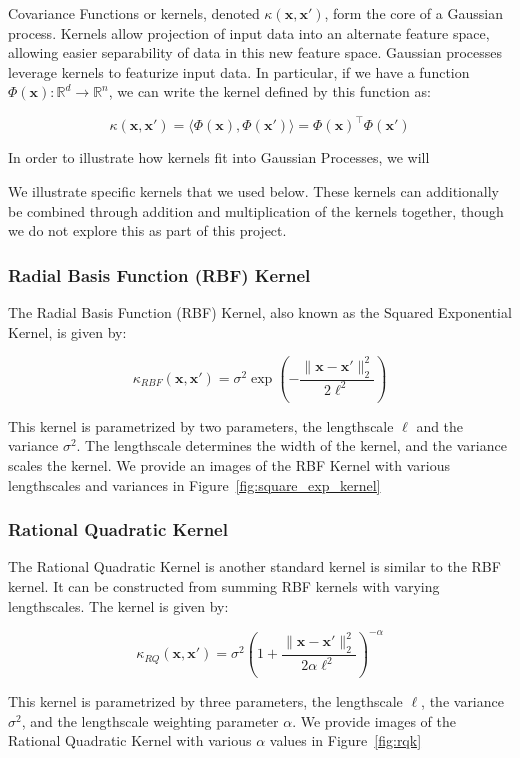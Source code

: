 \documentclass{article}
\newcommand{\R}{\mathbb{R}}
\newcommand{\bx}{\boldsymbol{x}}
\begin{document}
Covariance Functions or kernels, denoted $\kappa(\bx, \bx')$, form the core of a Gaussian process. Kernels allow
projection of input data into an alternate feature space, allowing easier separability of data in this new feature
space. Gaussian processes leverage kernels to featurize input data. In particular, if we have a function
$\Phi(\bx): \R^d \rightarrow \R^n$, we can write the kernel defined by this function as:

\[
  \kappa(\bx, \bx') = \langle \Phi(\bx), \Phi(\bx') \rangle = \Phi(\bx)^\top \Phi(\bx')
\]

In order to illustrate how kernels fit into Gaussian Processes, we will 


We illustrate specific kernels that we used below. These kernels can additionally be combined through addition and
multiplication of the kernels together, though we do not explore this as part of this project.

\subsubsection{Radial Basis Function (RBF) Kernel}

The Radial Basis Function (RBF) Kernel, also known as the Squared Exponential Kernel, is given by:

\[
  \kappa_{RBF}(\bx, \bx') = \sigma^2 \exp\left( - \frac{\|\bx -\bx' \|_{2}^{2}}{2 \ell^2} \right)
\]

This kernel is parametrized by two parameters, the lengthscale $\ell$ and the variance $\sigma^2$. The lengthscale
determines the width of the kernel, and the variance scales the kernel\cite{duvenaud_automatic_2014}. We provide an
images of the RBF Kernel with various lengthscales and variances in Figure~\ref{fig:square_exp_kernel}

\subsubsection{Rational Quadratic Kernel}

The Rational Quadratic Kernel is another standard kernel is similar to the RBF kernel. It can be constructed from
summing RBF kernels with varying lengthscales. The kernel is given by:

\[
  \kappa_{RQ}(\bx, \bx') = \sigma^2 \left( 1 + \frac{\| \bx - \bx' \|_{2}^{2}}{2 \alpha \ell^2} \right)^{-\alpha}
\]

This kernel is parametrized by three parameters, the lengthscale $\ell$, the variance $\sigma^2$, and the lengthscale
weighting parameter $\alpha$\cite{duvenaud_automatic_2014}. We provide images of the Rational Quadratic Kernel with
various $\alpha$ values in Figure~\ref{fig:rqk}
\end{document}
